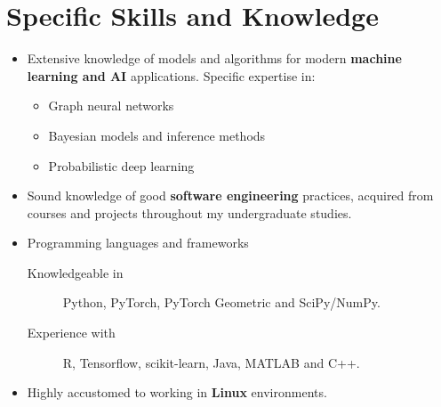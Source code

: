 \documentclass[12pt]{article}
\begin{document}
\section*{Specific Skills and Knowledge}
\begin{itemize}
    \item Extensive knowledge of models and algorithms for modern \textbf{machine learning and AI} applications. Specific expertise in:
    \begin{itemize}
        \item Graph neural networks
        \item Bayesian models and inference methods
        \item Probabilistic deep learning
    \end{itemize}

\item Sound knowledge of good \textbf{software engineering} practices, acquired from courses and projects throughout my undergraduate studies.

    \item Programming languages and frameworks
    \begin{description}
        \item [Knowledgeable in] Python, PyTorch, PyTorch Geometric and SciPy/NumPy.
        \item [Experience with] R, Tensorflow, scikit-learn, Java, MATLAB and C++.
    \end{description}

\item Highly accustomed to working in \textbf{Linux} environments.
\end{itemize}
\end{document}

